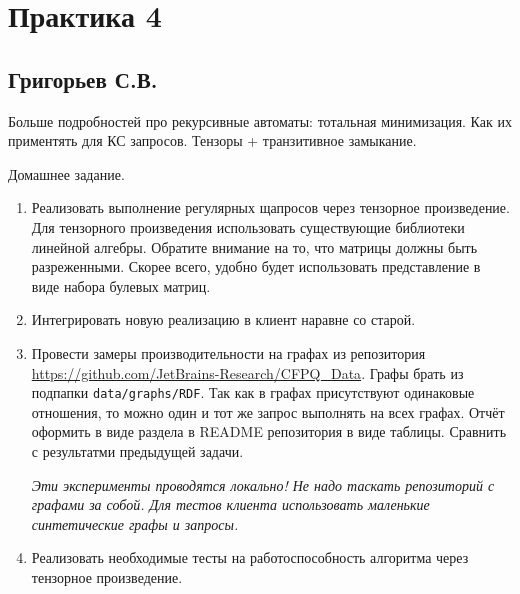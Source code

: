 \section{Практика 4}

\subsection{Григорьев С.В.}

Больше подробностей про рекурсивные автоматы: тотальная минимизация. Как их приментять для КС запросов. Тензоры + транзитивное замыкание.

Домашнее задание.
\begin{enumerate}
	\item Реализовать выполнение регулярных щапросов через тензорное произведение. Для тензорного произведения использовать существующие библиотеки линейной алгебры. Обратите внимание на то, что матрицы должны быть разреженными. Скорее всего, удобно будет использовать представление в виде набора булевых матриц.
	\item Интегрировать новую реализацию в клиент наравне со старой.
	\item Провести замеры производительности на графах из репозитория \url{https://github.com/JetBrains-Research/CFPQ_Data}. Графы брать из подпапки \verb|data/graphs/RDF|. Так как в графах присутствуют одинаковые отношения, то можно один и тот же запрос выполнять на всех графах. Отчёт оформить в виде раздела в  README репозитория в виде таблицы. Сравнить с результатми предыдущей задачи.

	\textit{Эти эксперименты проводятся локально! Не надо таскать репозиторий с графами за собой. Для тестов клиента использовать маленькие синтетические графы и запросы.}
	\item Реализовать необходимые тесты на работоспособность алгоритма через тензорное произведение.
\end{enumerate}
